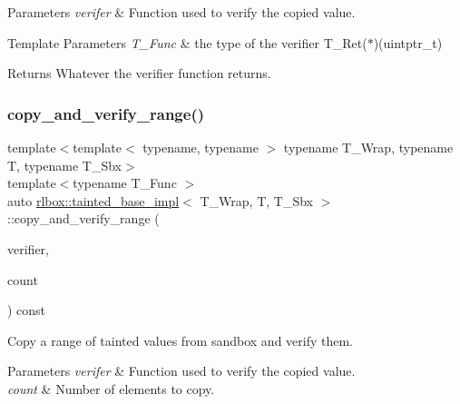 \begin{DoxyParams}{Parameters}
{\em verifer} & Function used to verify the copied value. \\
\hline
\end{DoxyParams}

\begin{DoxyTemplParams}{Template Parameters}
{\em T\+\_\+\+Func} & the type of the verifier {\ttfamily T\+\_\+\+Ret($\ast$)(uintptr\+\_\+t)} \\
\hline
\end{DoxyTemplParams}
\begin{DoxyReturn}{Returns}
Whatever the verifier function returns. 
\end{DoxyReturn}
\mbox{\label{classrlbox_1_1tainted__base__impl_a76e49089d448ba0cfa7ef6d7c1e2d288}} 
\subsubsection{\texorpdfstring{copy\+\_\+and\+\_\+verify\+\_\+range()}{copy\_and\_verify\_range()}}
{\footnotesize\ttfamily template$<$template$<$ typename, typename $>$ typename T\+\_\+\+Wrap, typename T, typename T\+\_\+\+Sbx$>$ \\
template$<$typename T\+\_\+\+Func $>$ \\
auto \hyperlink{classrlbox_1_1tainted__base__impl}{rlbox\+::tainted\+\_\+base\+\_\+impl}$<$ T\+\_\+\+Wrap, T, T\+\_\+\+Sbx $>$\+::copy\+\_\+and\+\_\+verify\+\_\+range (\begin{DoxyParamCaption}\item[{T\+\_\+\+Func}]{verifier,  }\item[{std\+::size\+\_\+t}]{count }\end{DoxyParamCaption}) const\hspace{0.3cm}{\ttfamily [inline]}}



Copy a range of tainted values from sandbox and verify them. 


\begin{DoxyParams}{Parameters}
{\em verifer} & Function used to verify the copied value. \\
\hline
{\em count} & Number of elements to copy. \\
\hline
\end{DoxyParams}

